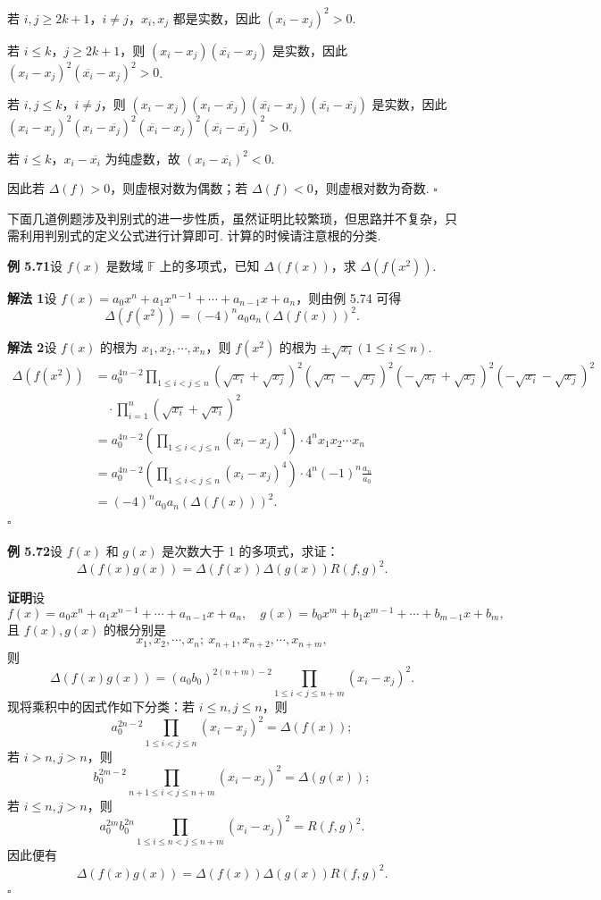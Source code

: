 \documentclass[UTF8,12pt,a4paper,fontset=fandol]{ctexart}
\begin{document}
若 $i,j\ge2k+1$，$i\ne j$，$x_i,x_j$ 都是实数，因此 $(x_i-x_j)^2>0$.

若 $i\le k$，$j\ge2k+1$，则 $(x_i-x_j)(\overline{x_i}-x_j)$ 是实数，因此 $(x_i-x_j)^2(\overline{x_i}-x_j)^2>0$.

若 $i,j\le k$，$i\ne j$，则 $(x_i-x_j)(x_i-\overline{x_j})(\overline{x_i}-x_j)(\overline{x_i}-\overline{x_j})$ 是实数，因此 $(x_i-x_j)^2(x_i-\overline{x_j})^2(\overline{x_i}-x_j)^2(\overline{x_i}-\overline{x_j})^2>0$.

若 $i\le k$，$x_i-\overline{x_i}$ 为纯虚数，故 $(x_i-\overline{x_i})^2<0$.

因此若 $\Delta(f)>0$，则虚根对数为偶数；若 $\Delta(f)<0$，则虚根对数为奇数. \hfill $\square$

下面几道例题涉及判别式的进一步性质，虽然证明比较繁琐，但思路并不复杂，只需利用判别式的定义公式进行计算即可. 计算的时候请注意根的分类.

\noindent\textbf{例 5.71}\quad 设 $f(x)$ 是数域 $\mathbb{F}$ 上的多项式，已知 $\Delta(f(x))$，求 $\Delta(f(x^2))$.

\noindent\textbf{解法 1}\quad 设 $f(x)=a_0x^n+a_1x^{n-1}+\cdots+a_{n-1}x+a_n$，则由例 5.74 可得
\[
\Delta(f(x^2))=(-4)^n a_0a_n(\Delta(f(x)))^2.
\]

\noindent\textbf{解法 2}\quad 设 $f(x)$ 的根为 $x_1,x_2,\cdots,x_n$，则 $f(x^2)$ 的根为 $\pm\sqrt{x_i}(1\le i\le n)$.
\[
\begin{aligned}
\Delta(f(x^2))
&=a_0^{4n-2}\prod_{1\le i<j\le n}(\sqrt{x_i}+\sqrt{x_j})^2(\sqrt{x_i}-\sqrt{x_j})^2(-\sqrt{x_i}+\sqrt{x_j})^2(-\sqrt{x_i}-\sqrt{x_j})^2\\
&\quad\cdot \prod_{i=1}^n(\sqrt{x_i}+\sqrt{x_i})^2\\
&=a_0^{4n-2}\left(\prod_{1\le i<j\le n}(x_i-x_j)^4\right)\cdot 4^nx_1x_2\cdots x_n\\
&=a_0^{4n-2}\left(\prod_{1\le i<j\le n}(x_i-x_j)^4\right)\cdot 4^n(-1)^n\frac{a_n}{a_0}\\
&=(-4)^na_0a_n(\Delta(f(x)))^2.
\end{aligned}
\]
\hfill $\square$

\noindent\textbf{例 5.72}\quad 设 $f(x)$ 和 $g(x)$ 是次数大于 1 的多项式，求证：
\[
\Delta(f(x)g(x))=\Delta(f(x))\Delta(g(x))R(f,g)^2.
\]

\noindent\textbf{证明}\quad 设
\[
f(x)=a_0x^n+a_1x^{n-1}+\cdots+a_{n-1}x+a_n,\quad
g(x)=b_0x^m+b_1x^{m-1}+\cdots+b_{m-1}x+b_m,
\]
且 $f(x),g(x)$ 的根分别是
\[
x_1,x_2,\cdots,x_n;\ x_{n+1},x_{n+2},\cdots,x_{n+m},
\]
则
\[
\Delta(f(x)g(x))=(a_0b_0)^{2(n+m)-2}\prod_{1\le i<j\le n+m}(x_i-x_j)^2.
\]
现将乘积中的因式作如下分类：若 $i\le n,j\le n$，则
\[
a_0^{2n-2}\prod_{1\le i<j\le n}(x_i-x_j)^2=\Delta(f(x));
\]
若 $i>n,j>n$，则
\[
b_0^{2m-2}\prod_{n+1\le i<j\le n+m}(x_i-x_j)^2=\Delta(g(x));
\]
若 $i\le n,j>n$，则
\[
a_0^{2m}b_0^{2n}\prod_{1\le i\le n<j\le n+m}(x_i-x_j)^2=R(f,g)^2.
\]
因此便有
\[
\Delta(f(x)g(x))=\Delta(f(x))\Delta(g(x))R(f,g)^2.
\]
\hfill $\square$
\end{document}

